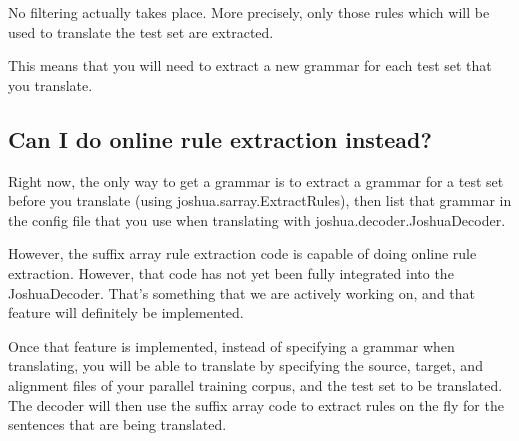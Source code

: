 No filtering actually takes place. More precisely, only those rules which will be used to translate the test set are extracted.

This means that you will need to extract a new grammar for each test set that you translate.


\subsection{Can I do online rule extraction instead?}

Right now, the only way to get a grammar is to extract a grammar for a test set before you translate (using joshua.sarray.ExtractRules), then list that grammar in the config file that you use when translating with joshua.decoder.JoshuaDecoder.

However, the suffix array rule extraction code is capable of doing online rule extraction. However, that code has not yet been fully integrated into the JoshuaDecoder. That's something that we are actively working on, and that feature will definitely be implemented.

Once that feature is implemented, instead of specifying a grammar when translating, you will be able to translate by specifying the source, target, and alignment files of your parallel training corpus, and the test set to be translated. The decoder will then use the suffix array code to extract rules on the fly for the sentences that are being translated.

